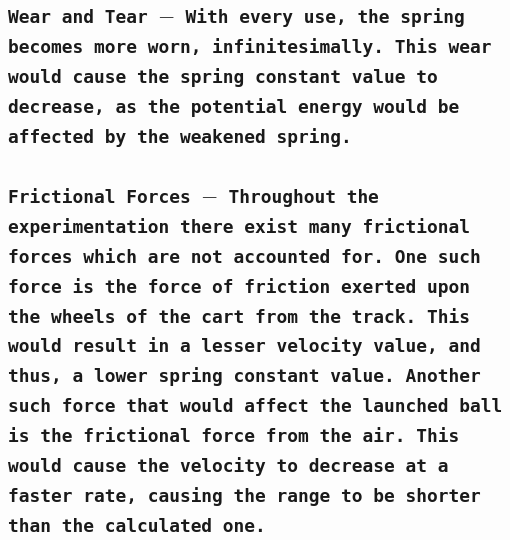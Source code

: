 \documentclass{article}
\begin{document}
\subsection{\texttt{Wear and Tear $-$ With every use, the spring becomes more worn, infinitesimally. This wear would cause the spring constant value to decrease, as the potential energy would be affected by the weakened spring.}}

\subsection{\texttt{Frictional Forces $-$ Throughout the experimentation there exist many frictional forces which are not accounted for. One such force is the force of friction exerted upon the wheels of the cart from the track. This would result in a lesser velocity value, and thus, a lower spring constant value. Another such force that would affect the launched ball is the frictional force from the air. This would cause the velocity to decrease at a faster rate, causing the range to be shorter than the calculated one.}}
\end{document}
